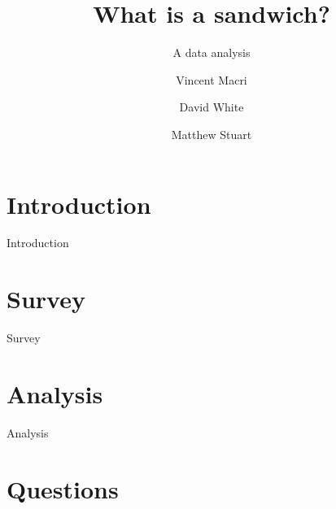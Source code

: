 

\title{What is a sandwich?}
\subtitle{A data analysis}
\author{Vincent Macri \and David White \and Matthew Stuart}


	\maketitle
	
	\tableofcontents
	\clearpage
	\part{Introduction}\label{part:introduction}
		{Introduction}
	\part{Survey}\label{part:survey}
		{Survey}
	\part{Analysis}\label{part:analysis}
		{Analysis}
	\appendix
	\part{Questions}\label{part:appendix}
	\nocite{*}
	\printbibliography

